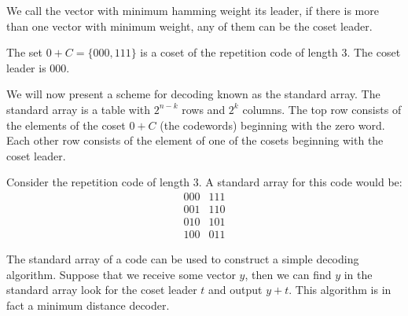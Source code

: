 We call the vector with minimum hamming weight its leader, if there is more than one vector with minimum weight, any of them can be the coset leader.
\begin{example}
The set $0+C=\{000,111\}$ is a coset of the repetition code of length 3. The coset leader is $000$.
\end{example}
We will now present a scheme for decoding known as the standard array. The standard array is a table with $2^{n-k}$ rows and $2^k$ columns. The top row consists of the elements of the coset $0+C$ (the codewords) beginning with the zero word. Each other row consists of the element of one of the cosets beginning with the coset leader.
\begin{example}
\label{ex:sarep3}
Consider the repetition code of length 3. A standard array for this code would be:
\begin{equation}
\begin{matrix}
000 & 111\\
001 & 110\\
010 & 101\\
100 & 011
\end{matrix}
\end{equation}
\end{example}
The standard array of a code can be used to construct a simple decoding algorithm. Suppose that we receive some vector $y$, then we can find $y$ in the standard array look for the coset leader $t$ and output $y+t$. This algorithm is in fact a minimum distance decoder. 


